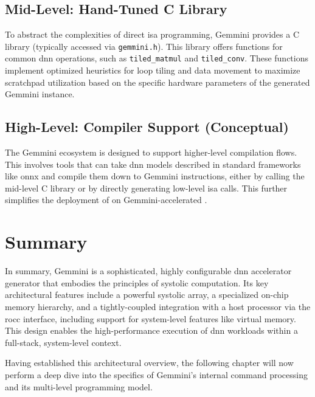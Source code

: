 \subsection{Mid-Level: Hand-Tuned C Library}
To abstract the complexities of direct \acrshort{isa} programming, Gemmini provides a C library (typically accessed via \texttt{gemmini.h}). This library offers functions for common \acrshort{dnn} operations, such as \texttt{tiled\_matmul} and \texttt{tiled\_conv}. These functions implement optimized heuristics for loop tiling and data movement to maximize scratchpad utilization based on the specific hardware parameters of the generated Gemmini instance.

\subsection{High-Level: Compiler Support (Conceptual)}
The Gemmini ecosystem is designed to support higher-level compilation flows. This involves tools that can take \acrshort{dnn} models described in standard frameworks like \acrfull{onnx} and compile them down to Gemmini instructions, either by calling the mid-level C library or by directly generating low-level \acrshort{isa} calls. This further simplifies the deployment of  on Gemmini-accelerated .


\section{Summary}
\label{sec:gemmini_overview_summary}
In summary, Gemmini is a sophisticated, highly configurable \acrshort{dnn} accelerator generator that embodies the principles of systolic computation. Its key architectural features include a powerful systolic array, a specialized on-chip memory hierarchy, and a tightly-coupled integration with a host processor via the \acrshort{rocc} interface, including support for system-level features like virtual memory. This design enables the high-performance execution of \acrshort{dnn} workloads within a full-stack, system-level context. 

Having established this architectural overview, the following chapter will now perform a deep dive into the specifics of Gemmini's internal command processing and its multi-level programming model.